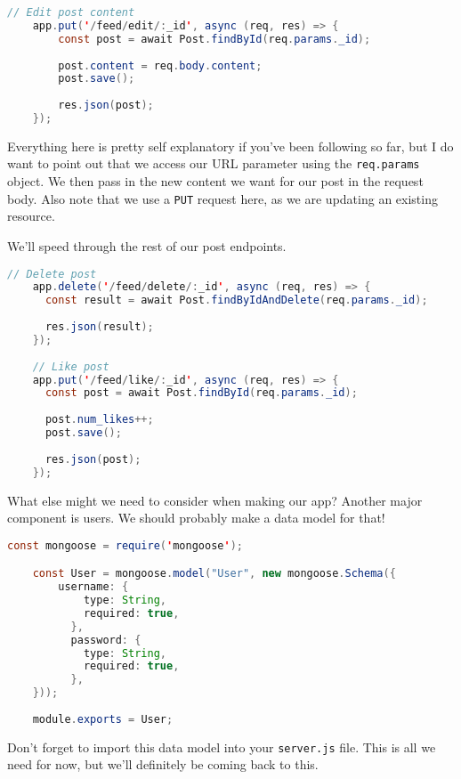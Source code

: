 \begin{lstlisting}[language=Java]
    // Edit post content
    app.put('/feed/edit/:_id', async (req, res) => {
        const post = await Post.findById(req.params._id);
    
        post.content = req.body.content;
        post.save();
    
        res.json(post);
    });
\end{lstlisting}

Everything here is pretty self explanatory if you've been following so far, but I do want to point out that we access our URL parameter using the \texttt{req.params} object. We then pass in the new content we want for our post in the request body. Also note that we use a \texttt{PUT} request here, as we are updating an existing resource.

We'll speed through the rest of our post endpoints.
\begin{lstlisting}[language=Java]
    // Delete post
    app.delete('/feed/delete/:_id', async (req, res) => {
      const result = await Post.findByIdAndDelete(req.params._id);
    
      res.json(result);
    });
    
    // Like post
    app.put('/feed/like/:_id', async (req, res) => {
      const post = await Post.findById(req.params._id);
    
      post.num_likes++;
      post.save();
    
      res.json(post);
    });
\end{lstlisting}

What else might we need to consider when making our app? Another major component is users. We should probably make a data model for that!

\begin{lstlisting}[language=Java]
    const mongoose = require('mongoose');

    const User = mongoose.model("User", new mongoose.Schema({
        username: {
            type: String,
            required: true,
          },
          password: {
            type: String,
            required: true,
          },
    }));
    
    module.exports = User;
\end{lstlisting}

Don't forget to import this data model into your \texttt{server.js} file. This is all we need for now, but we'll definitely be coming back to this. 

